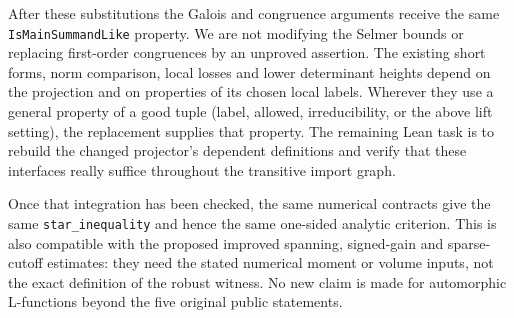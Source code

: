 \documentclass[11pt]{article}
\theoremstyle{definition}\newtheorem{definition}[theorem]{Definition}
\begin{document}
After these substitutions the Galois and congruence arguments receive the same \texttt{IsMainSummandLike} property. We are not modifying the Selmer bounds or replacing first-order congruences by an unproved assertion. The existing short forms, norm comparison, local losses and lower determinant heights depend on the projection and on properties of its chosen local labels. Wherever they use a general property of a good tuple (label, allowed, irreducibility, or the above lift setting), the replacement supplies that property. The remaining Lean task is to rebuild the changed projector's dependent definitions and verify that these interfaces really suffice throughout the transitive import graph.

Once that integration has been checked, the same numerical contracts give the same \texttt{star\_inequality} and hence the same one-sided analytic criterion. This is also compatible with the proposed improved spanning, signed-gain and sparse-cutoff estimates: they need the stated numerical moment or volume inputs, not the exact definition of the robust witness. No new claim is made for automorphic L-functions beyond the five original public statements.
\end{document}
